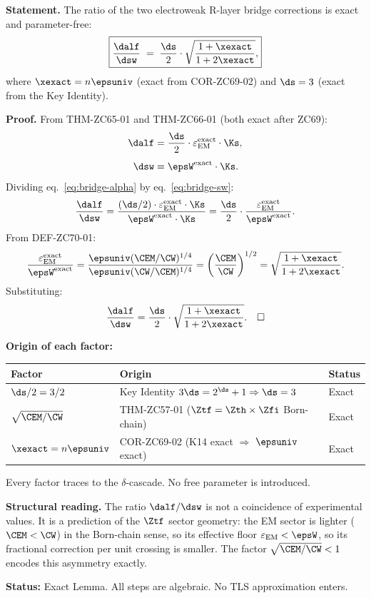 \documentclass[12pt, a4paper]{article}
\renewcommand{\epsEM}{\varepsilon_{\rm EM}}
\begin{document}
\begin{formalbox}[title={LEM-ZC70-01: Electroweak Ratio Identity ---
  $\delta\alpha/\alpha\,:\,\delta(\sin^2\theta_W) =
  (d_s/2)\sqrt{(1+x)/(1+2x)}$
  ($R_0/R_{\max}$, Exact)}]

\textbf{Statement.}
The ratio of the two electroweak R-layer bridge corrections
is exact and parameter-free:
\begin{equation}
  \boxed{
    \frac{\dalf}{\dsw}
    \;=\;
    \frac{\ds}{2}
    \cdot
    \sqrt{\frac{1 + \xexact}{1 + 2\xexact}},
  }
  \label{eq:ratio-identity}
\end{equation}
where $\xexact = n\epsuniv$ (exact from COR-ZC69-02)
and $\ds = 3$ (exact from the Key Identity).

\textbf{Proof.}
From THM-ZC65-01 and THM-ZC66-01 (both exact after ZC69):
\begin{align}
  \dalf &= \frac{\ds}{2}\cdot\epsEM^{\rm exact}\cdot\Ks,
  \label{eq:bridge-alpha}\\[4pt]
  \dsw  &= \epsW^{\rm exact}\cdot\Ks.
  \label{eq:bridge-sw}
\end{align}
Dividing eq.~\eqref{eq:bridge-alpha} by
eq.~\eqref{eq:bridge-sw}:
\[
  \frac{\dalf}{\dsw}
  = \frac{(\ds/2)\cdot\epsEM^{\rm exact}\cdot\Ks}
         {\epsW^{\rm exact}\cdot\Ks}
  = \frac{\ds}{2}\cdot\frac{\epsEM^{\rm exact}}{\epsW^{\rm exact}}.
\]
From DEF-ZC70-01:
\[
  \frac{\epsEM^{\rm exact}}{\epsW^{\rm exact}}
  = \frac{\epsuniv(\CEM/\CW)^{1/4}}
         {\epsuniv(\CW/\CEM)^{1/4}}
  = \left(\frac{\CEM}{\CW}\right)^{1/2}
  = \sqrt{\frac{1+\xexact}{1+2\xexact}}.
\]
Substituting:
\[
  \frac{\dalf}{\dsw}
  = \frac{\ds}{2}\cdot\sqrt{\frac{1+\xexact}{1+2\xexact}}.
  \quad\square
\]

\textbf{Origin of each factor:}
\begin{center}
\renewcommand{\arraystretch}{1.3}
\begin{tabular}{@{}lll@{}}
\toprule
Factor & Origin & Status \\
\midrule
$\ds/2 = 3/2$ & Key Identity $3\ds = 2^{\ds}+1 \Rightarrow \ds=3$ & Exact \\
$\sqrt{\CEM/\CW}$ & THM-ZC57-01 ($\Ztf = \Zth\times\Zfi$ Born-chain) & Exact \\
$\xexact = n\epsuniv$ & COR-ZC69-02 (K14 exact $\Rightarrow$ $\epsuniv$ exact) & Exact \\
\bottomrule
\end{tabular}
\end{center}

Every factor traces to the $\delta$-cascade.
No free parameter is introduced.

\textbf{Structural reading.}
The ratio $\dalf/\dsw$ is not a coincidence of experimental
values. It is a prediction of the $\Ztf$ sector geometry:
the EM sector is lighter ($\CEM < \CW$) in the Born-chain
sense, so its effective floor $\epsEM < \epsW$, so its
fractional correction per unit crossing is smaller.
The factor $\sqrt{\CEM/\CW} < 1$ encodes this asymmetry exactly.

\textbf{Status:} Exact Lemma.
All steps are algebraic. No TLS approximation enters.
\end{formalbox}
\end{document}
